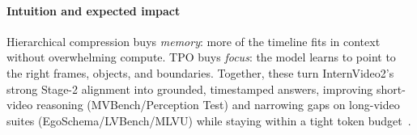 \begin{enrichment}
\begin{enrichment}
        \paragraph{Intuition and expected impact}
        \noindent
        Hierarchical compression buys \emph{memory}: more of the timeline fits in context without overwhelming compute. TPO buys \emph{focus}: the model learns to point to the right frames, objects, and boundaries. Together, these turn InternVideo2’s strong Stage-2 alignment into grounded, timestamped answers, improving short-video reasoning (MVBench/Perception Test) and narrowing gaps on long-video suites (EgoSchema/LVBench/MLVU) while staying within a tight token budget~\cite{wang2024_internvideo2,wang2025internvideo2_5}.
        
    \end{enrichment}
    
\end{enrichment}

\newpage

